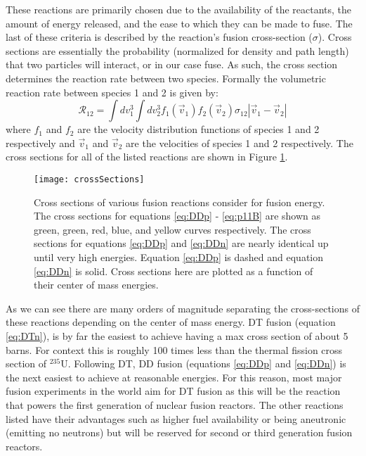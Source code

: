	These reactions are primarily chosen due to the availability of the reactants, the amount of energy released, and the ease to which they can be made to fuse. The last of these criteria is described by the reaction's fusion cross-section ($\sigma$). Cross sections are essentially the probability (normalized for density and path length) that two particles will interact, or in our case fuse. As such, the cross section determines the reaction rate between two species. Formally the volumetric reaction rate between species 1 and 2 is given by:  
	\begin{equation}
		\mathcal{R}_{12} = \int dv_1^3 \int dv_2^3 f_1(\vec{v}_1) f_2(\vec{v}_2) \sigma_{12} \left|\vec{v}_1 - \vec{v}_2\right|
		\label{eq:reactionRate}
	\end{equation}
	where $f_1$ and $f_2$ are the velocity distribution functions of species 1 and 2 respectively and $\vec{v}_1$ and $\vec{v}_2$ are the velocities of species 1 and 2 respectively. The cross sections for all of the listed reactions are shown in Figure \ref{fig:crossSections}. 
	
	\begin{figure}[h!]
		\centering
		\texttt{[image: crossSections]}
		\caption[Fusion Cross-Sections]{Cross sections of various fusion reactions consider for fusion energy. The cross sections for equations \ref{eq:DDp} - \ref{eq:p11B} are shown as green, green, red, blue, and yellow curves respectively. The cross sections for equations \ref{eq:DDp} and \ref{eq:DDn} are nearly identical up until very high energies. Equation \ref{eq:DDp} is dashed and equation \ref{eq:DDn} is solid. Cross sections here are plotted as a function of their center of mass energies. }
		\label{fig:crossSections}
	\end{figure}

	As we can see there are many orders of magnitude separating the cross-sections of these reactions depending on the center of mass energy. DT fusion (equation \ref{eq:DTn}), is by far the easiest to achieve having a max cross section of about 5 barns. For context this is roughly 100 times less than the thermal fission cross section of $^{235}$U. Following DT, DD fusion (equations \ref{eq:DDp} and \ref{eq:DDn}) is the next easiest to achieve at reasonable energies. For this reason, most major fusion experiments in the world aim for DT fusion as this will be the reaction that powers the first generation of nuclear fusion reactors. The other reactions listed have their advantages such as higher fuel availability or being aneutronic (emitting no neutrons) but will be reserved for second or third generation fusion reactors.
	
